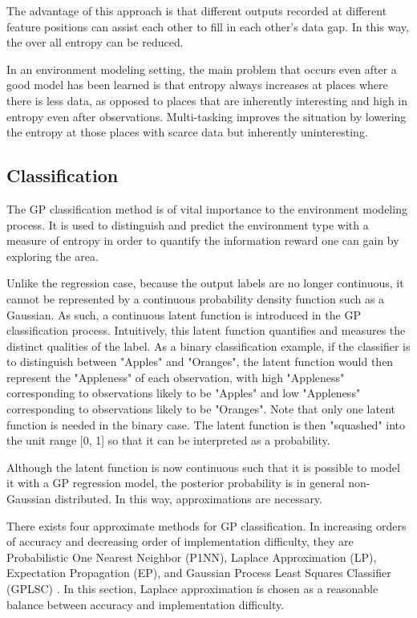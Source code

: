 				The advantage of this approach is that different outputs recorded at different feature positions can assist each other to fill in each other's data gap. In this way, the over all entropy can be reduced.
				
				In an environment modeling setting, the main problem that occurs even after a good model has been learned is that entropy always increases at places where there is less data, as opposed to places that are inherently interesting and high in entropy even after observations. Multi-tasking improves the situation by lowering the entropy at those places with scarce data but inherently uninteresting.
				
		\subsection{Classification}
		\label{Background:GaussianProcesses:Classification}
		
			The GP classification method is of vital importance to the environment modeling process. It is used to distinguish and predict the environment type with a measure of entropy in order to quantify the information reward one can gain by exploring the area.
			
			Unlike the regression case, because the output labels are no longer continuous, it cannot be represented by a continuous probability density function such as a Gaussian. As such, a continuous latent function is introduced in the GP classification process. Intuitively, this latent function quantifies and measures the distinct qualities of the label. As a binary classification example, if the classifier is to distinguish between "Apples" and "Oranges", the latent function would then represent the "Appleness" of each observation, with high "Appleness" corresponding to observations likely to be "Apples" and low "Appleness" corresponding to observations likely to be "Oranges". Note that only one latent function is needed in the binary case. The latent function is then "squashed" into the unit range [0, 1] so that it can be interpreted as a probability.
			
			Although the latent function is now continuous such that it is possible to model it with a GP regression model, the posterior probability is in general non-Gaussian distributed. In this way, approximations are necessary.
			
			There exists four approximate methods for GP classification. In increasing orders of accuracy and decreasing order of implementation difficulty, they are Probabilistic One Nearest Neighbor (P1NN), Laplace Approximation (LP), Expectation Propagation (EP), and Gaussian Process Least Squares Classifier (GPLSC) \cite{GaussianProcessForMachineLearning}. In this section, Laplace approximation is chosen as a reasonable balance between accuracy and implementation difficulty.
			
